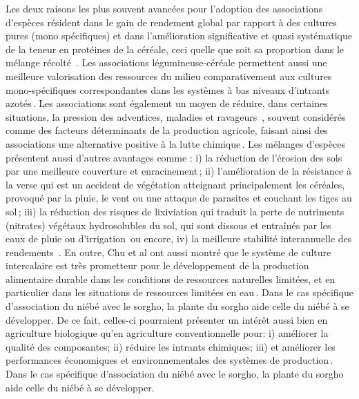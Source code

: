 \documentclass[a4paper,11pt]{article}
\begin{document}
Les deux raisons les plus souvent avancées pour l’adoption des
associations d’espèces résident dans le gain de rendement global par
rapport à des cultures pures (mono spécifiques) et dans l’amélioration
significative et quasi systématique de la teneur en protéines de la
céréale, ceci quelle que soit sa proportion dans le mélange récolté
\,\cite{Jensen_1996}. Les associations légumineuse-céréale permettent aussi
une meilleure valorisation des ressources du milieu comparativement
aux cultures mono-spécifiques correspondantes dans les systèmes à bas
niveaux d’intrants azotés\,\cite{Bedoussac_2010}. Les
associations sont également un moyen de réduire, dans certaines
situations, la pression des adventices, maladies et ravageurs
\,\cite{Altieri_1999}, souvent considérés comme des facteurs déterminants de
la production agricole, faisant ainsi des associations une alternative
positive à la lutte chimique\,\cite{Hauggaard_2001}. Les
mélanges d’espèces présentent aussi d’autres avantages comme : i) la
réduction de l’érosion des sols par une meilleure couverture et
enracinement\,\cite{Zougmoré_1998}; ii) l’amélioration de la
résistance à la verse qui est un accident de végétation atteignant
principalement les céréales, provoqué par la pluie, le vent ou une
attaque de parasites et couchant les tiges au sol\,\cite{Anil_1998};
iii) la réduction des risques de lixiviation qui traduit la perte de
nutriments (nitrates) végétaux hydrosolubles du sol, qui sont dissous
et entraînés par les eaux de pluie ou d’irrigation\,\cite{CorreHellou_2005}
ou encore, iv) la meilleure stabilité interannuelle des rendements
\,\cite{Lithourgidis_2006}. En outre, Chu et al ont aussi
montré que le système de culture intercalaire est très prometteur pour
le développement de la production alimentaire durable dans les
conditions de ressources naturelles limitées, et en particulier dans
les situations de ressources limitées en eau\,\cite{Tsubo_2005}. Dans
le cas spécifique d’association du niébé avec le sorgho, la plante du
sorgho aide celle du niébé à se développer. De ce fait, celles-ci
pourraient présenter un intérêt aussi bien en agriculture biologique
qu’en agriculture conventionnelle pour: i) améliorer la qualité des
composantes; ii) réduire les intrants chimiques; iii) et améliorer les
performances économiques et environnementales des systèmes de
production\,\cite{Koulibi_FideleZONGO}. Dans le cas spécifique
d'association du niébé avec le sorgho, la plante du sorgho aide celle
du niébé à se développer.

\end{document}
